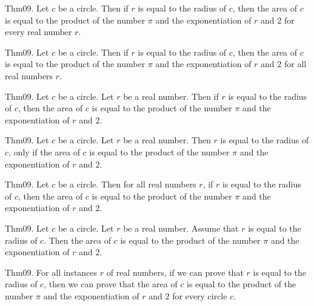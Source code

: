 \documentclass{article}
\begin{document}
Thm09. Let $c$ be a circle. Then if $r$ is equal to the radius of $c$, then the area of $c$ is equal to the product of the number \(\pi\) and the exponentiation of $r$ and $2$ for every real number $r$.

Thm09. Let $c$ be a circle. Then if $r$ is equal to the radius of $c$, then the area of $c$ is equal to the product of the number \(\pi\) and the exponentiation of $r$ and $2$ for all real numbers $r$.

Thm09. Let $c$ be a circle. Let $r$ be a real number. Then if $r$ is equal to the radius of $c$, then the area of $c$ is equal to the product of the number \(\pi\) and the exponentiation of $r$ and $2$.

Thm09. Let $c$ be a circle. Let $r$ be a real number. Then $r$ is equal to the radius of $c$, only if the area of $c$ is equal to the product of the number \(\pi\) and the exponentiation of $r$ and $2$.

Thm09. Let $c$ be a circle. Then for all real numbers $r$, if $r$ is equal to the radius of $c$, then the area of $c$ is equal to the product of the number \(\pi\) and the exponentiation of $r$ and $2$.

Thm09. Let $c$ be a circle. Let $r$ be a real number. Assume that $r$ is equal to the radius of $c$. Then the area of $c$ is equal to the product of the number \(\pi\) and the exponentiation of $r$ and $2$.

Thm09. For all instances $r$ of real numbers, if we can prove that $r$ is equal to the radius of $c$, then we can prove that the area of $c$ is equal to the product of the number \(\pi\) and the exponentiation of $r$ and $2$ for every circle $c$.
\end{document}
